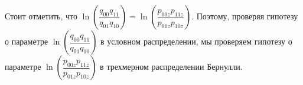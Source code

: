 Стоит отметить, что
$
\ln\left(\dfrac{q_{00}q_{11}}{q_{01}q_{10}}\right) =
\ln\left(\dfrac{p_{00z}p_{11z}}{p_{01z}p_{10z}}\right)
$. Поэтому, проверяя гипотезу о параметре
$\ln\left(\dfrac{q_{00}q_{11}}{q_{01}q_{10}}\right)$ в условном распределении,
мы проверяем гипотезу о параметре $\ln\left(\dfrac{p_{00z}p_{11z}}{p_{01z}p_{10z}}\right)$
в трехмерном распределении Бернулли.

